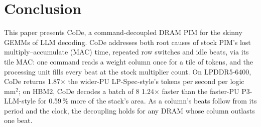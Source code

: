 \section{Conclusion}
\label{sec:conclusion}

This paper presents CoDe, a command-decoupled DRAM PIM for the skinny GEMMs of LLM decoding. CoDe addresses both root
causes of stock PIM's lost multiply--accumulate (MAC) time, repeated row switches and idle beats, via its tile MAC: one
command reads a weight column once for a tile of tokens, and the processing unit fills every beat at the stock
multiplier count. On LPDDR5-6400, CoDe returns 1.87$\times$ the wider-PU LP-Spec-style's tokens per second per logic
mm$^2$; on HBM2, CoDe decodes a batch of 8 1.24$\times$ faster than the faster-PU P3-LLM-style for 0.59\,\% more of the
stack's area. As a column's beats follow from its period and the clock, the decoupling holds for any
DRAM whose column outlasts one beat.

